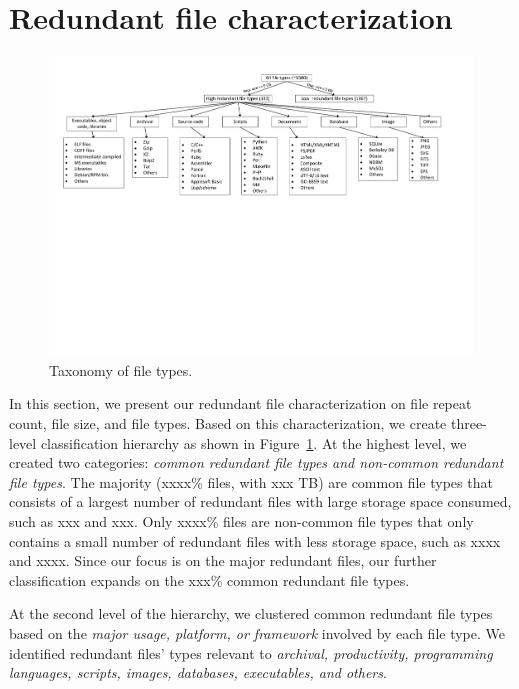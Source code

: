 \section{Redundant file characterization}
\label{sec:redundant_files}

\begin{figure}
	\centering
	\includegraphics[width=1\textwidth]{graphs/graph-types-hierarchy}
	\caption{Taxonomy of file types.
	}
	\label{fig:file-type-hierarchy}
\end{figure}

In this section, we present our redundant file characterization on file repeat count, file size, and file types. 
Based on this characterization, we create three-level classification hierarchy as shown in Figure~\ref{fig:file-type-hierarchy}.
At the highest level, we created two categories: \textit{common redundant file types and non-common redundant file types}. 
The majority (xxxx\% files, with xxx TB) are common file types that consists of a largest number of redundant files with large storage space consumed, such as xxx and xxx. 
Only xxxx\% files are non-common file types that only contains a small number of redundant files with less storage space, such as xxxx and xxxx. 
Since our focus is on the major redundant files, our further classification expands on the xxx\% common redundant file types.  

At the second level of the hierarchy, we clustered common redundant file types based on the \textit{major usage, platform, or framework} involved by each file type. We identified redundant files' types relevant to \textit{archival, productivity, programming languages, scripts, images, databases, executables, and others}.

